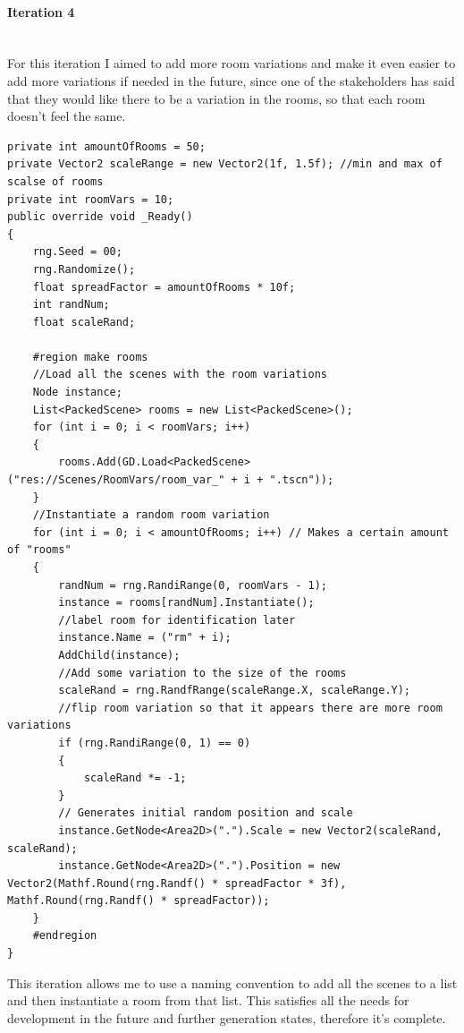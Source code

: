 \documentclass{article}
\newcommand{\myparagraph}[1]{\paragraph{#1}\mbox{}\\} %
\begin{document}
\myparagraph{Iteration 4}
For this iteration I aimed to add more room variations and make it even easier to add more variations if needed in the future, since one of the stakeholders has said that they would like there to be a variation in the rooms, so that each room doesn't feel the same.
\begin{lstlisting}
private int amountOfRooms = 50;
private Vector2 scaleRange = new Vector2(1f, 1.5f); //min and max of scalse of rooms
private int roomVars = 10;
public override void _Ready()
{
    rng.Seed = 00;
    rng.Randomize(); 
    float spreadFactor = amountOfRooms * 10f;
    int randNum;
    float scaleRand;
    
    #region make rooms
    //Load all the scenes with the room variations
    Node instance;
    List<PackedScene> rooms = new List<PackedScene>();
    for (int i = 0; i < roomVars; i++)
    {
        rooms.Add(GD.Load<PackedScene>("res://Scenes/RoomVars/room_var_" + i + ".tscn"));
    }
	//Instantiate a random room variation
    for (int i = 0; i < amountOfRooms; i++) // Makes a certain amount of "rooms"
    {
        randNum = rng.RandiRange(0, roomVars - 1);
        instance = rooms[randNum].Instantiate();
        //label room for identification later
        instance.Name = ("rm" + i);
        AddChild(instance);
		//Add some variation to the size of the rooms
        scaleRand = rng.RandfRange(scaleRange.X, scaleRange.Y);
		//flip room variation so that it appears there are more room variations
        if (rng.RandiRange(0, 1) == 0)
        {
            scaleRand *= -1;
        }
		// Generates initial random position and scale
        instance.GetNode<Area2D>(".").Scale = new Vector2(scaleRand, scaleRand);
        instance.GetNode<Area2D>(".").Position = new Vector2(Mathf.Round(rng.Randf() * spreadFactor * 3f), Mathf.Round(rng.Randf() * spreadFactor)); 
    }
    #endregion
}
\end{lstlisting}
This iteration allows me to use a naming convention to add all the scenes to a list and then instantiate a room from that list. This satisfies all the needs for development in the future and further generation states, therefore it's complete.
\end{document}
